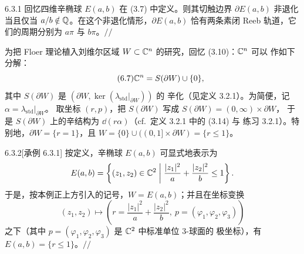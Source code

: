 \begin{wexam}{6.3.1}
  回忆四维辛椭球 $E(a,b)$ 在 (3.7) 中定义。则其切触边界 $\partial E(a,b)$ 非退化
  当且仅当 $a/b\notin\mathbb{Q}$。在这个非退化情形，$\partial E(a,b)$ 恰有两条素闭 Reeb
  轨道，它们的周期分别为 $a\pi$ 与 $b\pi$。\hfill$//$
\end{wexam}

为把 Floer 理论植入刘维尔区域 $W\subset\mathbb{C}^n$ 的研究，回忆 (3.10)：$\mathbb{C}^n$ 可以
作如下分解：
\begin{equation}\tag{6.7}
  \mathbb{C}^n=S(\partial W)\cup\{0\},
\end{equation}
其中 $S(\partial W)$ 是 $(\partial W,\ker(\lambda_{\mathrm{std}}|_{\partial W}))$ 的
辛化（见定义 3.2.1）。为简便，记 $\alpha=\lambda_{\mathrm{std}}|_{\partial W}$。
取坐标 $(r,p)$，把 $S(\partial W)$ 写成 $S(\partial W)=(0,\infty)\times\partial W$，
于是 $S(\partial W)$ 上的辛结构为 $\dd(r\alpha)$（cf.\ 定义 3.2.1 中的 (3.14) 与
练习 3.2.1）。特别地，$\partial W=\{r=1\}$，且
$W=\{0\}\cup((0,1]\times\partial W)=\{r\le 1\}$。


\begin{wexam}{6.3.2}[承例 6.3.1]
  按定义，辛椭球 $E(a,b)$ 可显式地表示为
  \[
    E(a,b)=\left\{(z_1,z_2)\in\mathbb{C}^2\;\middle|\;
    \frac{|z_1|^2}{a}+\frac{|z_2|^2}{b}\le 1\right\}.
  \]
  于是，按本例正上方引入的记号，$W=E(a,b)$；并且在坐标变换
  \[
    (z_1,z_2)\mapsto\left(r=\frac{|z_1|^2}{a}+\frac{|z_2|^2}{b},\ 
    p=(\varphi_1,\varphi_2,\varphi_3)\right)
  \]
  之下（其中 $p=(\varphi_1,\varphi_2,\varphi_3)$ 是 $\mathbb{C}^2$ 中标准单位 3-球面的
  极坐标），有 $E(a,b)=\{r\le1\}$。\hfill$//$
\end{wexam}

